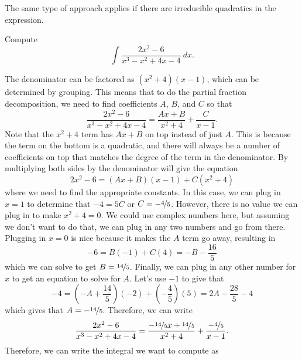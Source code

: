 The same type of approach applies if there are irreducible quadratics in the expression.

\begin{example}
Compute
\begin{equation*}
\int \frac{2x^2 - 6}{x^3 - x^2 + 4x - 4}\ dx.
\end{equation*}
\end{example}

\begin{exampleSol}
The denominator can be factored as $(x^2 + 4)(x-1)$, which can be determined by grouping. This means that to do the partial fraction decomposition, we need to find coefficients $A$, $B$, and $C$ so that
\begin{equation*}
\frac{2x^2 - 6}{x^3 - x^2 + 4x - 4} = \frac{Ax + B}{x^2 + 4} + \frac{C}{x-1}.
\end{equation*}
Note that the $x^2 + 4$ term has $Ax + B$ on top instead of just $A$. This is because the term on the bottom is a quadratic, and there will always be a number of coefficients on top that matches the degree of the term in the denominator. By multiplying both sides by the denominator will give the equation
\begin{equation*}
2x^2 - 6 = (Ax + B)(x-1) + C(x^2 + 4)
\end{equation*}
where we need to find the appropriate constants. In this case, we can plug in $x=1$ to determine that $-4 = 5C$ or $C = -\nicefrac{4}{5}$. However, there is no value we can plug in to make $x^2 + 4 = 0$. We could use complex numbers here, but assuming we don't want to do that, we can plug in any two numbers and go from there. Plugging in $x=0$ is nice because it makes the $A$ term go away, resulting in
\begin{equation*}
-6 = B(-1) + C(4) = -B - \frac{16}{5}
\end{equation*}
which we can solve to get $B = \nicefrac{14}{5}$. Finally, we can plug in any other number for $x$ to get an equation to solve for $A$. Let's use $-1$ to give that
\begin{equation*}
-4 = \left(-A + \frac{14}{5}\right)(-2) + \left(-\frac{4}{5}\right)(5) = 2A - \frac{28}{5} - 4
\end{equation*}
which gives that $A = -\nicefrac{14}{5}$. Therefore, we can write 
\begin{equation*}
\frac{2x^2 - 6}{x^3 - x^2 + 4x - 4} = \frac{-\nicefrac{14}{5}x + \nicefrac{14}{5}}{x^2 + 4} + \frac{-\nicefrac{4}{5}}{x-1}.
\end{equation*}
Therefore, we can write the integral we want to compute as

\end{exampleSol}
